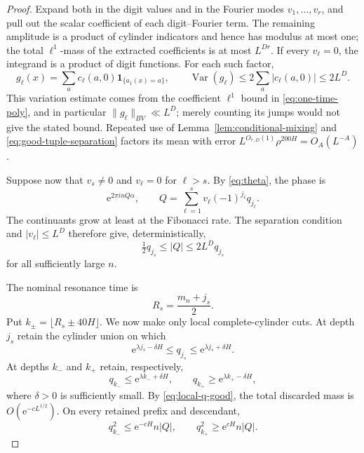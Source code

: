 \documentclass[11pt,a4paper]{amsart}
\theoremstyle{definition}
\theoremstyle{remark}
\newcommand{\ind}{\mathbf 1}
\newcommand{\Var}{\operatorname{Var}}
\newcommand{\e}{\mathrm e}
\begin{document}
\begin{proof}
Expand both in the digit values and in the Fourier modes
$v_1,\ldots,v_r$, and pull out the scalar coefficient of each
digit--Fourier term.  The remaining amplitude is a product of cylinder
indicators and hence has modulus at most one; the total $\ell^1$-mass of the
extracted coefficients is at most $L^{Dr}$.  If every $v_\ell=0$, the
integrand is a product of digit functions.  For each such factor,
\[
 g_\ell(x)=\sum_a c_\ell(a,0)\ind_{\{a_1(x)=a\}},
 \qquad
 \Var(g_\ell)\le2\sum_a|c_\ell(a,0)|\le2L^D.
\]
This variation estimate comes from the coefficient $\ell^1$ bound in
\eqref{eq:one-time-poly}, and in particular $\|g_\ell\|_{BV}\ll L^D$; merely
counting its jumps would not give the stated bound.  Repeated use of
Lemma~\ref{lem:conditional-mixing} and
\eqref{eq:good-tuple-separation} factors its mean with error
$L^{O_{r,D}(1)}\rho^{200H}=O_A(L^{-A})$.

Suppose now that $v_s\ne0$ and $v_\ell=0$ for $\ell>s$.  By
\eqref{eq:theta}, the phase is
\[
 \e^{2\pi i nQ\alpha},
 \qquad
 Q=\sum_{\ell=1}^{s}v_\ell(-1)^{j_\ell}q_{j_\ell}.
\]
The continuants grow at least at the Fibonacci rate.  The separation
condition and $|v_\ell|\le L^D$ therefore give, deterministically,
\begin{equation}\label{eq:Q-dominance}
 \tfrac12q_{j_s}\le|Q|\le2L^Dq_{j_s}
\end{equation}
for all sufficiently large $n$.

The nominal resonance time is
\[
 R_s=\frac{m_n+j_s}{2}.
\]
Put $k_\pm=\lfloor R_s\pm40H\rfloor$.  We now make only local complete-cylinder
cuts.  At depth $j_s$ retain the cylinder union on which
\[
 \e^{\lambda j_s-\delta H}\le q_{j_s}
 \le \e^{\lambda j_s+\delta H}.
\]
At depths $k_-$ and $k_+$ retain, respectively,
\[
 q_{k_-}\le \e^{\lambda k_-+\delta H},\qquad
 q_{k_+}\ge \e^{\lambda k_+-\delta H},
\]
where $\delta>0$ is sufficiently small.  By
\eqref{eq:local-q-good}, the total discarded mass is
$O(\e^{-cL^{1/2}})$.  On every retained prefix and descendant,
\begin{equation}\label{eq:pre-post-resonance}
 q_{k_-}^2\le \e^{-cH}n|Q|,
 \qquad
 q_{k_+}^2\ge \e^{cH}n|Q|.
\end{equation}


\end{proof}
\end{document}
